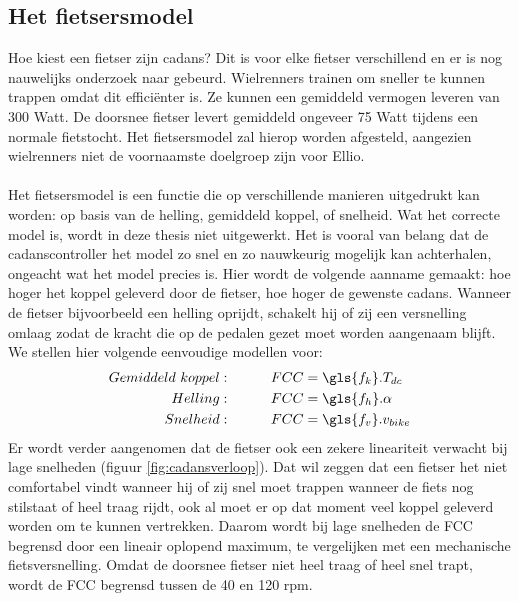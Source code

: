 \subsection*{Het fietsersmodel}
Hoe kiest een fietser zijn cadans? Dit is voor elke fietser verschillend en er is nog nauwelijks onderzoek naar gebeurd. Wielrenners trainen om sneller te kunnen trappen omdat dit efficiënter is. Ze kunnen een gemiddeld vermogen leveren van 300 Watt. De doorsnee fietser levert gemiddeld ongeveer 75 Watt tijdens een normale fietstocht. Het fietsersmodel zal hierop worden afgesteld, aangezien wielrenners niet de voornaamste doelgroep zijn voor Ellio.
\\\\
Het fietsersmodel is een functie die op verschillende manieren uitgedrukt kan worden: op basis van de helling, gemiddeld koppel, of snelheid. Wat het correcte model is, wordt in deze thesis niet uitgewerkt. Het is vooral van belang dat de cadanscontroller het model zo snel en zo nauwkeurig mogelijk kan achterhalen, ongeacht wat het model precies is. Hier wordt de volgende aanname gemaakt: hoe hoger het koppel geleverd door de fietser, hoe hoger de gewenste cadans. Wanneer de fietser bijvoorbeeld een helling oprijdt, schakelt hij of zij een versnelling omlaag zodat de kracht die op de pedalen gezet moet worden aangenaam blijft. We stellen hier volgende eenvoudige modellen voor:
\begin{align*}
Gemiddeld \ koppel:\tab FCC &= \gls{f_k} . T_{dc}\\
Helling:\tab FCC &= \gls{f_h} . \alpha\\
Snelheid:\tab FCC &= \gls{f_v} . v_{bike}
\end{align*}
Er wordt verder aangenomen dat de fietser ook een zekere lineariteit verwacht bij lage snelheden (figuur \ref{fig:cadansverloop}). Dat wil zeggen dat een fietser het niet comfortabel vindt wanneer hij of zij snel moet trappen wanneer de fiets nog stilstaat of heel traag rijdt, ook al moet er op dat moment veel koppel geleverd worden om te kunnen vertrekken. Daarom wordt bij lage snelheden de FCC begrensd door een lineair oplopend maximum, te vergelijken met een mechanische fietsversnelling. Omdat de doorsnee fietser niet heel traag of heel snel trapt, wordt de FCC begrensd tussen de 40 en 120 rpm.
